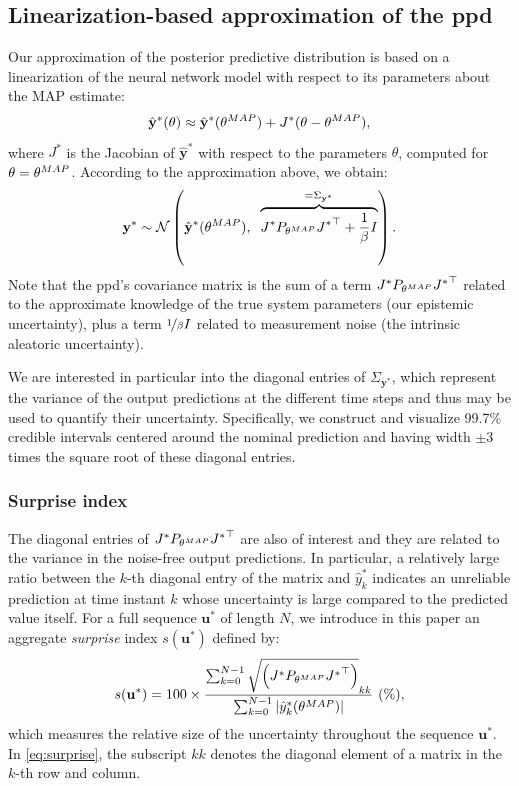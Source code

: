 \documentclass{ifacconf}
\newcommand{\nsamp}{N}
\newcommand{\N}{\mathcal{N}} %
\newcommand{\MAP}{{\rm MAP}}
\newcommand{\tvec}[1]{{\mathbf{#1}}}
\newcommand{\mean}[1]{\hat{#1}}
\begin{document}
\subsection{Linearization-based approximation of the ppd}
Our approximation of the posterior predictive distribution is based on a linearization of the neural network model with respect to its parameters about the MAP estimate:
\begin{equation}
 \mean{\tvec{y}}^*(\theta) \approx \mean{\tvec{y}}^*(\theta^{\MAP}) + J^*(\theta - \theta^{\MAP}),%
\end{equation}
where $J^{*}$ is the Jacobian of $\mean{\tvec{y}}^*$ with respect to the parameters $\theta$, computed for $\theta=\theta^{\rm MAP}$.
According to the approximation above, we obtain:
\begin{equation}
\label{eq:ppd_approx}
 \tvec{y}^* \sim \N \left(\mean{\tvec{y}}^*(\theta^{\MAP}),\;\; \overbrace{J^* P_{\theta^{\MAP}} {J^*}^\top  + \frac{1}{\beta} I}^{=\Sigma_{\tvec{y}^*}} \right).
\end{equation}
Note that the ppd's covariance matrix is the sum of a term $J^* P_{\theta^{\MAP}} {J^*}^\top$ related to the approximate knowledge of the true system parameters (our epistemic uncertainty), plus a term $\nicefrac{1}{\beta} I$ related to measurement noise (the intrinsic aleatoric uncertainty). 

We are interested in particular into the diagonal entries of $\Sigma_{\tvec{y}^*}$, which represent the variance of the output predictions at the different time steps and thus may be used to quantify their uncertainty. Specifically, we construct and visualize 99.7\% credible intervals centered around the nominal prediction and having width $\pm 3$ times the square root of these diagonal entries.

\subsubsection{Surprise index}
The diagonal entries of $J^* P_{\theta^{\MAP}} {J^*}^\top$ are also of interest and they are related to the variance in the noise-free output predictions. In particular, a relatively large ratio between the $k$-th diagonal entry of the matrix and $\mean{{y}}^*_{k}$ indicates an unreliable prediction at time instant $k$ whose uncertainty is large compared to the predicted value itself. 
For a full sequence $\tvec{u}^*$ of length $\nsamp$, we introduce in this paper an aggregate \emph{surprise} index $s(\tvec{u}^*)$ defined by:
\begin{equation}
\label{eq:surprise}
s(\tvec{u}^*) =  100 \times \frac{\sum_{k=0}^{\nsamp-1} \sqrt{\left (J^* P_{\theta^{\MAP}} {J^*}^\top \right )}_{kk}}{\sum_{k=0}^{\nsamp-1} |\mean{y}_k^{*}(\theta^{\MAP})|}~(\%),
\end{equation}
which measures the relative size of the uncertainty throughout the sequence $\tvec{u}^*$. In \eqref{eq:surprise}, the subscript  $kk$ denotes the diagonal element of a matrix in the $k$-th row and column.   
\end{document}
